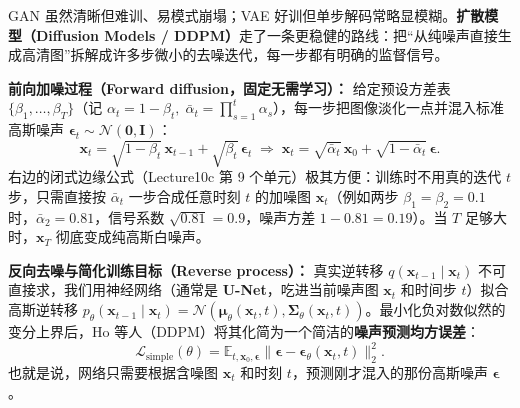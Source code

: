 
GAN 虽然清晰但难训、易模式崩塌；VAE 好训但单步解码常略显模糊。\textbf{扩散模型（Diffusion Models / DDPM）}走了一条更稳健的路线：把“从纯噪声直接生成高清图”拆解成许多步微小的去噪迭代，每一步都有明确的监督信号。

\textbf{前向加噪过程（Forward diffusion，固定无需学习）：} 给定预设方差表 $\{\beta_1,\dots,\beta_T\}$（记 $\alpha_t=1-\beta_t,\;\bar{\alpha}_t=\prod_{s=1}^t \alpha_s$），每一步把图像淡化一点并混入标准高斯噪声 $\boldsymbol{\epsilon}_t\sim\mathcal{N}(\mathbf{0},\mathbf{I})$：
\[
\mathbf{x}_t = \sqrt{1-\beta_t}\,\mathbf{x}_{t-1} + \sqrt{\beta_t}\,\boldsymbol{\epsilon}_t
\;\Longrightarrow\;
\mathbf{x}_t = \sqrt{\bar{\alpha}_t}\,\mathbf{x}_0 + \sqrt{1-\bar{\alpha}_t}\,\boldsymbol{\epsilon}.
\tag{10.6}
\]
右边的闭式边缘公式（Lecture10c 第 9 个单元）极其方便：训练时不用真的迭代 $t$ 步，只需直接按 $\bar{\alpha}_t$ 一步合成任意时刻 $t$ 的加噪图 $\mathbf{x}_t$（例如两步 $\beta_1=\beta_2=0.1$ 时，$\bar{\alpha}_2=0.81$，信号系数 $\sqrt{0.81}=0.9$，噪声方差 $1-0.81=0.19$）。当 $T$ 足够大时，$\mathbf{x}_T$ 彻底变成纯高斯白噪声。

\textbf{反向去噪与简化训练目标（Reverse process）：} 真实逆转移 $q(\mathbf{x}_{t-1}\mid\mathbf{x}_t)$ 不可直接求，我们用神经网络（通常是 \textbf{U-Net}，吃进当前噪声图 $\mathbf{x}_t$ 和时间步 $t$）拟合高斯逆转移 $p_\theta(\mathbf{x}_{t-1}\mid\mathbf{x}_t)=\mathcal{N}(\boldsymbol{\mu}_\theta(\mathbf{x}_t,t),\boldsymbol{\Sigma}_\theta(\mathbf{x}_t,t))$。最小化负对数似然的变分上界后，Ho 等人（DDPM）将其化简为一个简洁的\textbf{噪声预测均方误差}：
\[
\mathcal{L}_{\text{simple}}(\theta) = \mathbb{E}_{t,\mathbf{x}_0,\boldsymbol{\epsilon}}\bigl\|\boldsymbol{\epsilon} - \boldsymbol{\epsilon}_\theta(\mathbf{x}_t, t)\bigr\|_2^2.
\tag{10.7}
\]
也就是说，网络只需要根据含噪图 $\mathbf{x}_t$ 和时刻 $t$，预测刚才混入的那份高斯噪声 $\boldsymbol{\epsilon}$。


